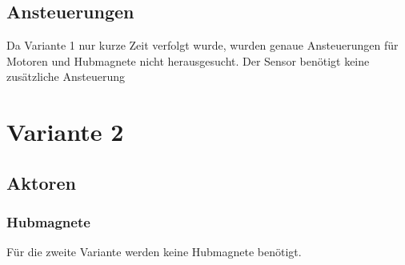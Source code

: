 \subsection{Ansteuerungen}
Da Variante 1 nur kurze Zeit verfolgt wurde, wurden genaue Ansteuerungen für Motoren und Hubmagnete nicht herausgesucht. Der Sensor benötigt keine zusätzliche Ansteuerung
\newpage
\section{Variante 2}
\subsection{Aktoren}
\subsubsection{Hubmagnete}
Für die zweite Variante werden keine Hubmagnete benötigt.

